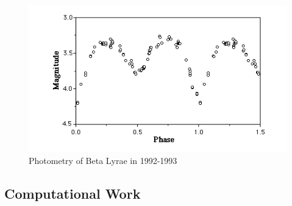 \documentclass{article}
\begin{document}
\begin{itemize}
\begin{figure}
\centering
\includegraphics[scale=0.5]{LC}
\caption{Photometry of Beta Lyrae in 1992-1993}
\end{figure}

\end{itemize}
\subsection{Computational Work}

  
\end{document}
